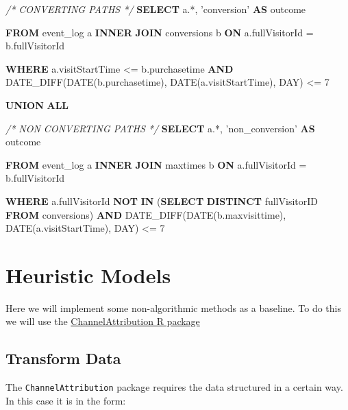 \documentclass[]{book}
\newenvironment{Shaded}{\begin{snugshade}}{\end{snugshade}}
\newcommand{\CommentTok}[1]{\textcolor[rgb]{0.56,0.35,0.01}{\textit{#1}}}
\newcommand{\DataTypeTok}[1]{\textcolor[rgb]{0.13,0.29,0.53}{#1}}
\newcommand{\DecValTok}[1]{\textcolor[rgb]{0.00,0.00,0.81}{#1}}
\newcommand{\KeywordTok}[1]{\textcolor[rgb]{0.13,0.29,0.53}{\textbf{#1}}}
\newcommand{\NormalTok}[1]{#1}
\newcommand{\StringTok}[1]{\textcolor[rgb]{0.31,0.60,0.02}{#1}}
\begin{document}
\begin{Shaded}
\begin{Highlighting}[]
  \CommentTok{/* CONVERTING PATHS */}
  \KeywordTok{SELECT}\NormalTok{ a.*,}
         \StringTok{'conversion'} \KeywordTok{AS}\NormalTok{ outcome}

  \KeywordTok{FROM}\NormalTok{ event_log a}
    \KeywordTok{INNER} \KeywordTok{JOIN}\NormalTok{ conversions b }\KeywordTok{ON}\NormalTok{ a.fullVisitorId = b.fullVisitorId  }

  \KeywordTok{WHERE}\NormalTok{ a.visitStartTime <= b.purchasetime }
    \KeywordTok{AND}\NormalTok{ DATE_DIFF(}\DataTypeTok{DATE}\NormalTok{(b.purchasetime), }\DataTypeTok{DATE}\NormalTok{(a.visitStartTime), }\DataTypeTok{DAY}\NormalTok{)  <= }\DecValTok{7}

\KeywordTok{UNION} \KeywordTok{ALL}

  \CommentTok{/* NON CONVERTING PATHS */}
  \KeywordTok{SELECT}\NormalTok{ a.*,}
         \StringTok{'non_conversion'} \KeywordTok{AS}\NormalTok{ outcome}

  \KeywordTok{FROM}\NormalTok{ event_log a}
    \KeywordTok{INNER} \KeywordTok{JOIN}\NormalTok{ maxtimes b }\KeywordTok{ON}\NormalTok{ a.fullVisitorId = b.fullVisitorId }

  \KeywordTok{WHERE}\NormalTok{ a.fullVisitorId }\KeywordTok{NOT} \KeywordTok{IN}\NormalTok{ (}\KeywordTok{SELECT} \KeywordTok{DISTINCT}\NormalTok{ fullVisitorID }\KeywordTok{FROM}\NormalTok{ conversions)}
   \KeywordTok{AND}\NormalTok{  DATE_DIFF(}\DataTypeTok{DATE}\NormalTok{(b.maxvisittime), }\DataTypeTok{DATE}\NormalTok{(a.visitStartTime), }\DataTypeTok{DAY}\NormalTok{) <= }\DecValTok{7}
\end{Highlighting}
\end{Shaded}

\hypertarget{heuristic-models}{%
\chapter{Heuristic Models}\label{heuristic-models}}

Here we will implement some non-algorithmic methods as a baseline. To do this
we will use the \href{https://cran.r-project.org/web/packages/ChannelAttribution}{ChannelAttribution R package}

\hypertarget{transform-data}{%
\section{Transform Data}\label{transform-data}}

The \texttt{ChannelAttribution} package requires the data structured in a certain
way. In this case it is in the form:
\end{document}
